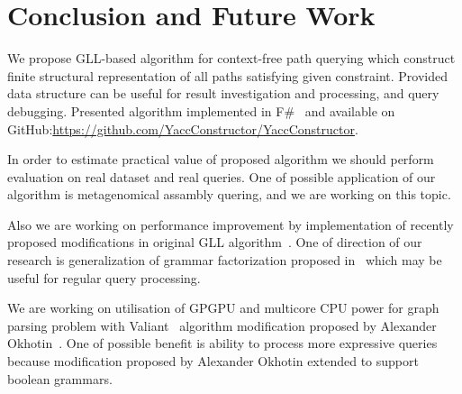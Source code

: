 \section{Conclusion and Future Work}

We propose GLL-based algorithm for context-free path querying which construct finite structural representation of all paths satisfying given constraint.
Provided data structure can be useful for result investigation and processing, and query debugging.
Presented algorithm implemented in F\#~\cite{FSharp} and available on GitHub:\url{https://github.com/YaccConstructor/YaccConstructor}.

In order to estimate practical value of proposed algorithm we should perform evaluation on real dataset and real queries.
One of possible application of our algorithm is metagenomical assambly quering, and we are working on this topic.

Also we are working on performance improvement by implementation of recently proposed modifications in original GLL algorithm~\cite{FGLL}.
One of direction of our research is generalization of grammar factorization proposed in~\cite{FGLL} which may be useful for regular query processing.

We are working on utilisation of GPGPU and multicore CPU power for graph parsing problem with Valiant~\cite{valiantParsingWithMatrixMultiplication} algorithm modification proposed 
by Alexander Okhotin~\cite{okhotin2014parsingWithMatrixMultiplication}.
One of possible benefit is ability to process more expressive queries because modification proposed by Alexander Okhotin extended to support boolean grammars.
